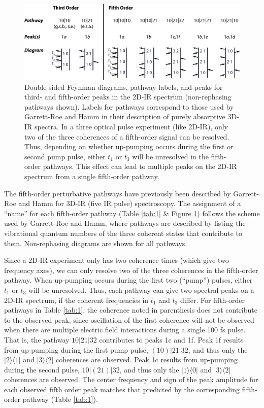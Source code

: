 \begin{figure}
\includegraphics[scale=0.85]{./anions/sgr_pathways_02.eps}
\caption[Double sided Feynman diagrams for 3rd and 5th order signals]{\label{fig:Feynman}Double-sided Feynman diagrams, pathway labels, and peaks for third- and fifth-order peaks in the  2D-IR spectrum (non-rephasing pathways shown). Labels for pathways correspond to those used by Garrett-Roe and Hamm in their description of purely absorptive 3D-IR spectra.\cite{Garrett-Roe2009b} In a three optical pulse experiment (like 2D-IR), only two of the three coherences of a fifth-order signal can be resolved. Thus, depending on whether up-pumping occurs during the first or second pump pulse, either $t_1$ or $t_3$ will be unresolved in the fifth-order pathways. This effect can lead to multiple peaks on the 2D-IR spectrum from a single fifth-order pathway.}
\end{figure}

The fifth-order perturbative pathways have previously been described by Garrett-Roe and Hamm for 3D-IR (five IR pulse) spectroscopy.\cite{Garrett-Roe2009b} The assignment of a ``name'' for each fifth-order pathway (Table \ref{tab:1} \& Figure \ref{fig:Feynman}) follows the scheme used by Garrett-Roe and Hamm, where pathways are described by listing the vibrational quantum numbers of the three coherent states that contribute to them. Non-rephasing diagrams are shown for all pathways.

Since a 2D-IR experiment only has two coherence times (which give two frequency axes), we can only resolve two of the three coherences in the fifth-order pathway. When up-pumping occurs during the first two (``pump'') pulses, either $t_1$ or $t_3$ will be unresolved. Thus, each pathway can give two spectral peaks on a 2D-IR spectrum, if the coherent frequencies in $t_1$ and $t_3$ differ.  For fifth-order pathways in Table \ref{tab:1}, the coherence noted in parenthesis does not contribute to the observed peak, since oscillation of the first coherence will not be observed when there are multiple electric field interactions during a single 100 fs pulse. That is, the pathway $10|21|32$ contributes to peaks 1c and 1f. Peak 1f results from up-pumping during the first pump pulse, $\left(10\right)|21|32$, and thus only the $|2\rangle\langle1|$ and $|3\rangle\langle2|$ coherences are observed. Peak 1c results from up-pumping during the second pulse, $10|\left(21\right)|32$, and thus only the $|1\rangle\langle0|$ and $|3\rangle\langle2|$ coherences are observed. The center frequency and sign of the peak amplitude for each observed fifth order peak matches that predicted by the corresponding fifth-order pathway (Table \ref{tab:1}).

